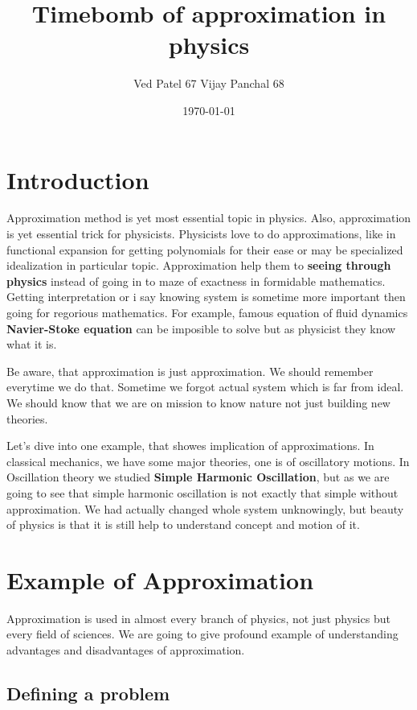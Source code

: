\documentclass[11pt,a4paper]{article}
\author{Ved Patel 67 Vijay Panchal 68}
\date{\today}
\title{Timebomb of approximation in physics}
\begin{document}
\maketitle
\tableofcontents

\pagebreak
\section{Introduction}
\label{sec:org2832ecd}

Approximation method is yet most essential topic in physics. Also, approximation is yet essential trick for physicists. Physicists love to do approximations, like in functional expansion for getting polynomials for their ease or may be specialized idealization in particular topic. Approximation help them to \textbf{seeing through physics} instead of going in to maze of exactness in formidable  mathematics. Getting interpretation or i say knowing system is sometime more important then going for regorious mathematics. For example, famous equation of fluid dynamics \textbf{Navier-Stoke equation} can be imposible to solve but as physicist they know what it is.

Be aware, that approximation is just approximation. We should remember everytime we do that. Sometime we forgot actual system which is far from ideal. We should know that we are on mission to know nature not just building new theories.

Let's dive into one example, that showes implication of approximations. In classical mechanics, we have some major theories, one is of oscillatory motions. In Oscillation theory we studied \textbf{Simple Harmonic Oscillation}, but as we are going to see that simple harmonic oscillation is not exactly that simple without approximation. We had actually changed whole system unknowingly, but beauty of physics is that it is still help to understand concept and motion of it. 

\section{Example of Approximation}
\label{sec:org994e3a4}

Approximation is used in almost every branch of physics, not just physics but every field of sciences. We are going to give profound example of understanding advantages and disadvantages of approximation.

\subsection{Defining a problem}
\label{sec:orgac3f1ab}
\end{document}
